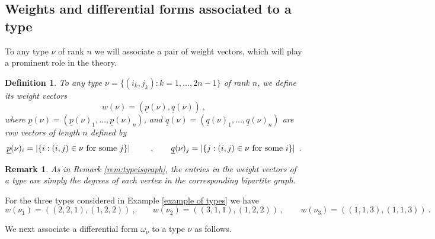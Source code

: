 \documentclass[10pt]{amsart}
\newcommand{\pp}{{\underline{p}}}
\newcommand{\qq}{{\underline{q}}}
\theoremstyle{plain}
\newtheorem{remark}[thm]{Remark}
\newtheorem{defn}[thm]{Definition}
\newcommand{\0}{\color{blue}{\mathsf{0}}}
\begin{document}
\subsection{Weights and differential forms associated to a type}  \label{sect: weightsoftypes} To any type $\nu$ of rank $n$ we will associate a pair of weight vectors, which will play  
a   prominent role in the theory. 
\begin{defn}\label{defn: weight}
To any type $\nu = \{(i_k,j_k): k=1,\ldots, 2n-1\} $ of rank $n$,  we define its \emph{weight vectors} 
\[  w(\nu) = (\pp(\nu), \qq(\nu))\ , \]
 where $\pp(\nu) = (\pp(\nu)_1,\ldots, \pp(\nu)_n)$, and  $ \qq(\nu) = (\qq(\nu)_1,\ldots,\qq(\nu)_n)$ are row vectors of length $n$ defined by
 \[ \pp(\nu)_i =  \left|\{i: (i,j) \in \nu \hbox{ for some } j \}  \right|\qquad \ , \qquad  \qq(\nu)_j =  \left| \{j: (i,j) \in \nu \hbox{ for some } i  \} \right| \ .  \]
\end{defn}
\begin{remark} As in Remark \ref{rem:typeisgraph}, the entries in the  weight vectors of a type are simply the  degrees of each vertex in the corresponding bipartite graph. 
    \end{remark}

  For the three types considered in Example \ref{example of types} we have
\[ w(\nu_1) = ((2,2,1),(1,2,2))\ ,\qquad
 w(\nu_2) = ((3,1,1),(1,2,2))\ ,\qquad
 w(\nu_3) = ((1,1,3),(1,1,3)) \ .   \]


We next associate a differential form $\omega_{\nu}$ to a type $\nu$ as follows.
\end{document}
